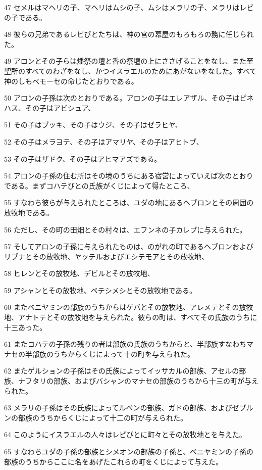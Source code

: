 \par 47 セメルはマヘリの子、マヘリはムシの子、ムシはメラリの子、メラリはレビの子である。
\par 48 彼らの兄弟であるレビびとたちは、神の宮の幕屋のもろもろの務に任じられた。
\par 49 アロンとその子らは燔祭の壇と香の祭壇の上にささげることをなし、また至聖所のすべてのわざをなし、かつイスラエルのためにあがないをなした。すべて神のしもべモーセの命じたとおりである。
\par 50 アロンの子孫は次のとおりである。アロンの子はエレアザル、その子はピネハス、その子はアビシュア、
\par 51 その子はブッキ、その子はウジ、その子はゼラヒヤ、
\par 52 その子はメラヨテ、その子はアマリヤ、その子はアヒトブ、
\par 53 その子はザドク、その子はアヒマアズである。
\par 54 アロンの子孫の住む所はその境のうちにある宿営によっていえば次のとおりである。まずコハテびとの氏族がくじによって得たところ、
\par 55 すなわち彼らが与えられたところは、ユダの地にあるヘブロンとその周囲の放牧地である。
\par 56 ただし、その町の田畑とその村々は、エフンネの子カレブに与えられた。
\par 57 そしてアロンの子孫に与えられたものは、のがれの町であるヘブロンおよびリブナとその放牧地、ヤッテルおよびエシテモアとその放牧地、
\par 58 ヒレンとその放牧地、デビルとその放牧地、
\par 59 アシャンとその放牧地、ベテシメシとその放牧地である。
\par 60 またベニヤミンの部族のうちからはゲバとその放牧地、アレメテとその放牧地、アナトテとその放牧地を与えられた。彼らの町は、すべてその氏族のうちに十三あった。
\par 61 またコハテの子孫の残りの者は部族の氏族のうちからと、半部族すなわちマナセの半部族のうちからくじによって十の町を与えられた。
\par 62 またゲルションの子孫はその氏族によってイッサカルの部族、アセルの部族、ナフタリの部族、およびバシャンのマナセの部族のうちから十三の町が与えられた。
\par 63 メラリの子孫はその氏族によってルベンの部族、ガドの部族、およびゼブルンの部族のうちからくじによって十二の町が与えられた。
\par 64 このようにイスラエルの人々はレビびとに町々とその放牧地とを与えた。
\par 65 すなわちユダの子孫の部族とシメオンの部族の子孫と、ベニヤミンの子孫の部族のうちからここに名をあげたこれらの町をくじによって与えた。
